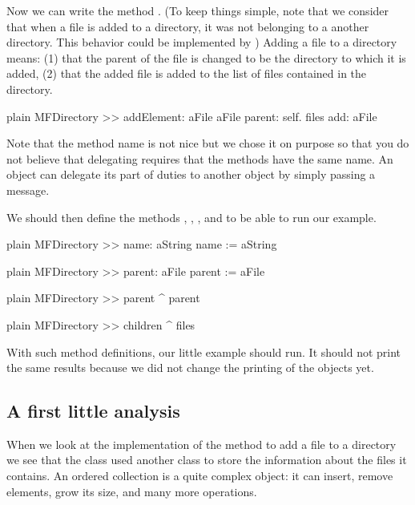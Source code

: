 \documentclass[10pt,twoside,english]{_support/latex/sbabook/sbabook}
\begin{document}
Now we can write the method . 
(To keep things simple, note that we consider that when a file is added to a directory, it was not belonging to a another directory. This behavior could be implemented by )
Adding a file to a directory means: (1) that the parent of the file is changed to be the directory to which it is added, (2) that the added file is added to the list of files contained in the directory.

\begin{displaycode}{plain}
MFDirectory >> addElement: aFile
	aFile parent: self. 
	files add: aFile
\end{displaycode}

Note that the method name  is not nice but we chose it on purpose so that you do not believe that delegating
requires that the methods have the same name. An object can delegate its part of duties to another object by simply passing a message. 

We should then define the methods , , , and  to be able to run our example.

\begin{displaycode}{plain}
MFDirectory >> name: aString
	name := aString
\end{displaycode}

\begin{displaycode}{plain}
MFDirectory >> parent: aFile
	parent := aFile
\end{displaycode}

\begin{displaycode}{plain}
MFDirectory >> parent
	^ parent
\end{displaycode}

\begin{displaycode}{plain}
MFDirectory >> children
	^ files
\end{displaycode}

With such method definitions, our little example should run. It should not print the same results because we did not change the printing of the objects yet. 
\subsection{A first little analysis}
When we look at the implementation of the method to add a file to a directory we see that the class  used another class  to store the information about the files it contains. An ordered collection is a quite complex object: it can insert, remove elements, grow its size, and many more operations. 
\end{document}
